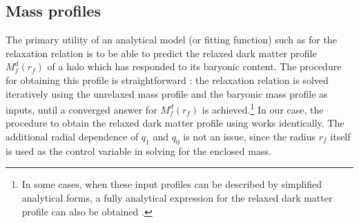 \subsection{Mass profiles}
\label{sec:mass-prof-demo-ch:z0main}
The primary utility of an analytical model (or fitting function) such as  for the relaxation relation is to be able to predict the relaxed dark matter profile $M_f^d(r_f)$ of a halo which has responded to its baryonic content. The procedure for obtaining this profile is straightforward \citep[see, e.g., Appendix A of][]{2021MNRAS.503.4147P}: the relaxation relation is solved iteratively using the unrelaxed mass profile and the baryonic mass profile as inputs, until a converged answer for $M_f^d(r_f)$ is achieved.\footnote{In some cases, when these input profiles can be described by simplified analytical forms, a fully analytical expression for the relaxed dark matter profile can also be obtained \citep[see, e.g., Appendix A of][]{2021MNRAS.507..632P}.} In our case, the procedure to obtain the relaxed dark matter profile using  works identically. The additional radial dependence of $q_1$ and $q_0$ is not an issue, since the radius $r_f$ itself is used as the control variable in solving for the enclosed mass.

